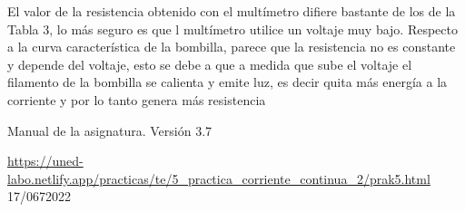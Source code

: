 \documentclass{article}
\begin{document}
\begin{multicols}{2}
El valor de la resistencia obtenido con el multímetro difiere bastante de los de la Tabla 3, lo más seguro es que l multímetro utilice un voltaje muy bajo. Respecto a la curva característica de la bombilla, parece que la resistencia no es constante y depende del voltaje, esto se debe a que a medida que sube el voltaje el filamento de la bombilla se calienta y emite luz, es decir quita más energía a la corriente y por lo tanto genera más resistencia

\begin{thebibliography}{1}

  Manual de la asignatura. Versión 3.7

  \url{https://uned-labo.netlify.app/practicas/te/5_practica_corriente_continua_2/prak5.html} 17/0672022

\end{thebibliography}
\end{multicols}
\end{document}
